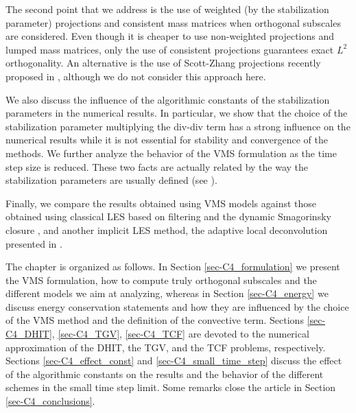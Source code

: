 The second point that we address is the use of weighted (by the stabilization parameter) projections and consistent mass matrices when orthogonal subscales are considered. Even though it is cheaper to use non-weighted projections and lumped mass matrices, only the use of consistent projections guarantees exact $L^2$ orthogonality. An alternative is the use of Scott-Zhang projections recently proposed in \cite{Badia2012}, although we do not consider this approach here.

We also discuss the influence of the algorithmic constants of the stabilization parameters in the numerical results. In particular, we show that the choice of the stabilization parameter multiplying the div-div term has a strong influence on the numerical results while it is not essential for stability and convergence of the methods. We further analyze the behavior of the VMS formulation as the time step size is reduced. These two facts are actually related by the way the stabilization parameters are usually defined (see \cite{gamnitzer_time-dependent_2010,Hsu2010}).

Finally, we compare the results obtained using VMS models against those obtained using classical LES based on filtering and the dynamic Smagorinsky closure \cite{fauconnier_construction_2009}, and another implicit LES method, the adaptive local deconvolution presented in \cite{hickel_adaptive_2006}. 

The chapter is organized as follows. In Section \ref{sec-C4_formulation} we present the VMS formulation, how to compute truly orthogonal subscales and the different models we aim at analyzing, whereas in Section \ref{sec-C4_energy} we discuss energy conservation statements and how they are influenced by the choice of the VMS method and the definition of the convective term. Sections \ref{sec-C4_DHIT},  \ref{sec-C4_TGV},  \ref{sec-C4_TCF} are devoted to the numerical approximation of the DHIT, the TGV, and the TCF problems, respectively. Sections \ref{sec-C4_effect_const} and \ref{sec-C4_small_time_step} discuss the effect of the algorithmic constants on the results and the behavior of the different schemes in the small time step limit. Some remarks close the article in Section \ref{sec-C4_conclusions}.

